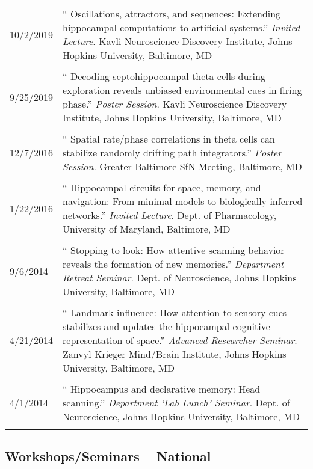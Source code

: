\documentclass[10pt]{article}
\newcommand{\unpubtitle}[1]{{\color{hopkinsblue} #1}}
\begin{document}
\begin{longtable}{@{\hspace{0.2in}}l>{\raggedright\arraybackslash}p{}}
  10/2/2019 \hspace{0.1in} & ``\unpubtitle{Oscillations, attractors, and
  sequences: Extending hippocampal computations to artificial systems}.''
  \emph{Invited Lecture}. Kavli Neuroscience Discovery Institute, Johns Hopkins
  University, Baltimore, MD\\
  \tabularnewline
  9/25/2019 & ``\unpubtitle{Decoding septohippocampal theta cells during
  exploration reveals unbiased environmental cues in firing phase}.''
  \emph{Poster Session}. Kavli Neuroscience Discovery Institute, Johns Hopkins
  University, Baltimore, MD\\
  \tabularnewline
  12/7/2016 & ``\unpubtitle{Spatial rate/phase correlations in theta cells
  can stabilize randomly drifting path integrators}.'' \emph{Poster Session}.
  Greater Baltimore SfN Meeting, Baltimore, MD\\
  \tabularnewline
  1/22/2016 & ``\unpubtitle{Hippocampal circuits for space, memory, and
  navigation: From minimal models to biologically inferred networks}.''
  \emph{Invited Lecture}. Dept. of Pharmacology, University of Maryland,
  Baltimore, MD\\
  \tabularnewline
  9/6/2014 & ``\unpubtitle{Stopping to look: How attentive scanning behavior
  reveals the formation of new memories}.'' \emph{Department Retreat Seminar}.
  Dept. of Neuroscience, Johns Hopkins University, Baltimore, MD\\
  \tabularnewline
  4/21/2014 & ``\unpubtitle{Landmark influence: How attention to sensory cues
  stabilizes and updates the hippocampal cognitive representation of space}.''
  \emph{Advanced Researcher Seminar}. Zanvyl Krieger Mind/Brain Institute, Johns
  Hopkins University, Baltimore, MD\\
  \tabularnewline
  4/1/2014 & ``\unpubtitle{Hippocampus and declarative memory: Head scanning}.''
  \emph{Department `Lab Lunch' Seminar}. Dept. of Neuroscience, Johns Hopkins
  University, Baltimore, MD\\
  \tabularnewline
\end{longtable}

\subsection*{Workshops/Seminars -- National}
\end{document}
